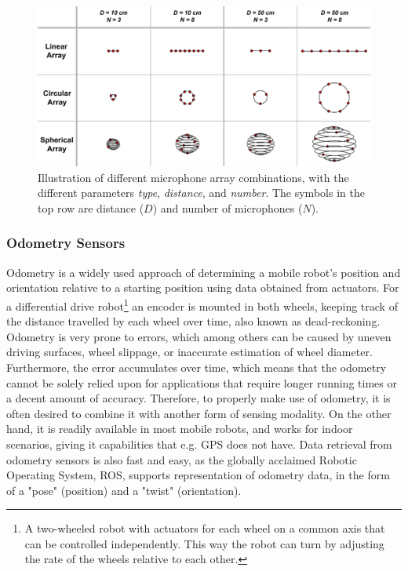\begin{figure}[H]
    \centering
    \includegraphics[width=\textwidth]{figures/1Problem_analysis/Microphone_array.pdf}
    \caption{Illustration of different microphone array combinations, with the different parameters \textit{type}, \textit{distance}, and \textit{number}. The symbols in the top row are distance ($D$) and number of microphones ($N$).}
    \label{fig:mic_array}
\end{figure}

\subsubsection{Odometry Sensors}
Odometry is a widely used approach of determining a mobile robot's position and orientation relative to a starting position using data obtained from actuators. For a differential drive robot\footnote{A two-wheeled robot with actuators for each wheel on a common axis that can be controlled independently. This way the robot can turn by adjusting the rate of the wheels relative to each other.} an encoder is mounted in both wheels, keeping track of the distance travelled by each wheel over time, also known as dead-reckoning. Odometry is very prone to errors, which among others can be caused by uneven driving surfaces, wheel slippage, or inaccurate estimation of wheel diameter. Furthermore, the error accumulates over time, which means that the odometry cannot be solely relied upon for applications that require longer running times or a decent amount of accuracy. Therefore, to properly make use of odometry, it is often desired to combine it with another form of sensing modality. On the other hand, it is readily available in most mobile robots, and works for indoor scenarios, giving it capabilities that e.g. GPS does not have. Data retrieval from odometry sensors is also fast and easy, as the globally acclaimed Robotic Operating System, \gls{ROS}, supports representation of odometry data, in the form of a "pose" (position) and a "twist" (orientation). \cite{General:Handbook_of_Robotics}


